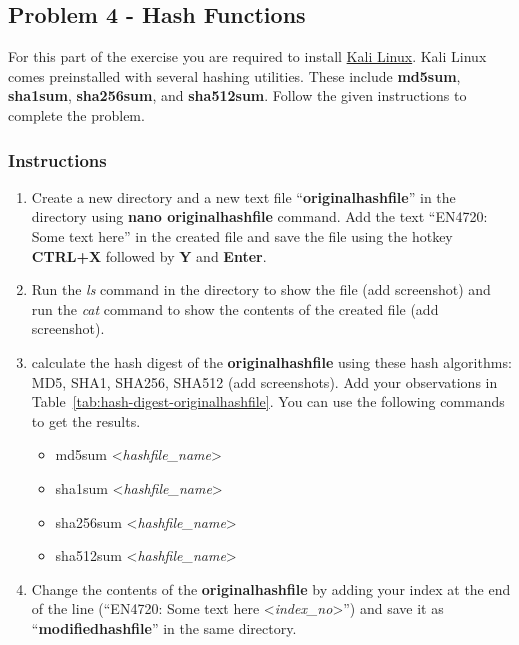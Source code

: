 \documentclass[11pt,letterpaper]{article}
\begin{document}
	\subsection*{Problem 4 - Hash Functions}
	
	{For this part of the exercise you are required to install \href{https://www.kali.org/get-kali/#kali-platforms}{Kali Linux}. Kali Linux comes preinstalled with several hashing utilities. These include \textbf{md5sum}, \textbf{sha1sum},
		\textbf{sha256sum}, and \textbf{sha512sum}. Follow the given instructions to complete the problem.}
	
	\subsubsection*{Instructions}
	\begin{enumerate}
		\item Create a new directory and a new text file ``\textbf{originalhashfile}'' in the directory using \textbf{nano originalhashfile} command. Add the text ``EN4720: Some text here'' in the created file and save the file using the hotkey \textbf{CTRL+X} followed by \textbf{Y} and \textbf{Enter}.
		
		\item Run the \textit{ls} command in the directory to show the file (add screenshot) and run the \textit{cat} command to show the contents of the created file (add screenshot).
		
		\item calculate the hash digest of the \textbf{originalhashfile} using these hash algorithms: MD5, SHA1, SHA256, SHA512 (add screenshots). Add your observations in Table~\ref{tab:hash-digest-originalhashfile}. You can use the following commands to get the results.
		\begin{itemize}
			\item md5sum \textless \textit{hashfile\_name}\textgreater
			\item sha1sum \textless \textit{hashfile\_name}\textgreater
			\item sha256sum \textless \textit{hashfile\_name}\textgreater
			\item sha512sum \textless \textit{hashfile\_name}\textgreater
		\end{itemize}
		
		\item Change the contents of the \textbf{originalhashfile} by adding your index at the end of the line (``EN4720: Some text here \textless\textit{index\_no}\textgreater'') and save it as ``\textbf{modifiedhashfile}'' in the same directory.
		

\end{enumerate}
\end{document}

